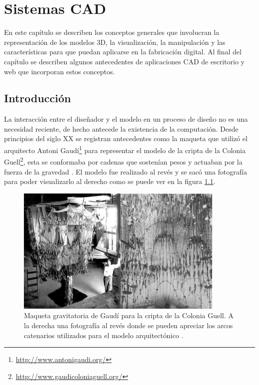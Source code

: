 \chapter{{Sistemas CAD}}
\label{chap: cap2}
En este capítulo se describen los conceptos generales que involucran la representación de los modelos 3D, la visualización, la manipulación y las características para que puedan aplicarse en la fabricación digital. Al final del capítulo se describen algunos antecedentes de aplicaciones CAD de escritorio y web que incorporan estos conceptos.\newline

\section{Introducción}

La interacción entre el diseñador y el modelo en un proceso de diseño no es una necesidad reciente, de hecho antecede la existencia de la computación. 
Desde principios del siglo XX se registran antecedentes como la maqueta que utilizó el arquitecto Antoni  Gaudí\footnote{\url{http://www.antonigaudi.org/}} para representar el modelo de la cripta de la Colonia Guell\footnote{\url{http://www.gaudicoloniaguell.org/}}, esta se conformaba por  cadenas que sostenían pesos y actuaban por la fuerza de la gravedad \citep{Davis2013}. El modelo fue realizado al revés y se sacó una fotografía para poder visualizarlo al derecho como se puede ver en la figura \ref{fig:gaudi}. 

\begin{figure}[ht]
\includegraphics[width=10cm]{Img/GEO/geo-gaudic.jpg}
\centering
\caption{\footnotesize{Maqueta gravitatoria de Gaudí para la cripta de la Colonia Guell. A la derecha una fotografía al revés donde se pueden apreciar los arcos catenarios utilizados para el modelo arquitectónico  \citep{AA.VV2002}.}}
\label{fig:gaudi}
\end{figure}

